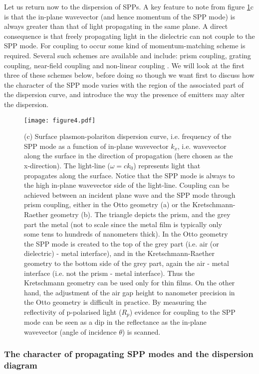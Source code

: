 \documentclass[12pt]{iopart}
\begin{document}
Let us return now to the dispersion of SPPs. A key feature to note from figure \ref{fig_SPP2}c is that the in-plane wavevector (and hence momentum of the SPP mode) is always greater than that of light propagating in the same plane. A direct consequence is that freely propagating light in the dielectric can not couple to the SPP mode. For coupling to occur some kind of momentum-matching scheme is required. Several such schemes are available and include: prism coupling, grating coupling, near-field coupling and non-linear coupling \cite{Renger_PRL_2009_103_266802}. We will look at the first three of these schemes below, before doing so though we want first to discuss how the character of the SPP mode varies with the region of the associated part of the dispersion curve, and introduce the way the presence of emitters may alter the dispersion.

\begin{figure}
\texttt{[image: figure4.pdf]}
\caption{(c) Surface plasmon-polariton dispersion curve, i.e. frequency of the SPP mode as a function of in-plane wavevector $k_x$, i.e. wavevector along the surface in the direction of propagation (here chosen as the x-direction). The light-line ($\omega=ck_0$) represents light that propagates along the surface. Notice that the SPP mode is always to the high in-plane wavevector side of the light-line. Coupling can be achieved between an incident plane wave and the SPP mode through prism coupling, either in the Otto geometry (a) or the Kretschmann-Raether geometry (b). The triangle depicts the prism, and the grey part the metal (not to scale since the metal film is typically only some tens to hundreds of nanometers thick). In the Otto geometry the SPP mode is created to the top of the grey part (i.e. air (or dielectric) - metal interface), and in the Kretschmann-Raether geometry to the bottom side of the grey part, again the air - metal interface (i.e. not the prism - metal interface). Thus the Kretschmann geometry can be used only for thin films. On the other hand, the adjustment of the air gap height to nanometer precision in the Otto geometry is difficult in practice. By measuring the reflectivity of p-polarised light ($R_p$) evidence for coupling to the SPP mode can be seen as a dip in the reflectance as the in-plane wavevector (angle of incidence $\theta$) is scanned.} 
\label{fig_SPP2}
\end{figure}

\subsubsection{The character of propagating SPP modes and the dispersion diagram}  \label{CharacterOfSPPDispersionPaivi}
\end{document}
